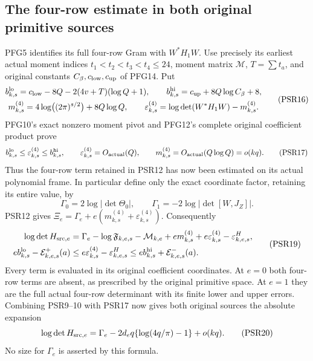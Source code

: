 \documentclass[10pt]{article}
\begin{document}
\subsection{The four-row estimate in both original primitive sources}
PFG5 identifies its full four-row Gram with $W^*H_1W$. Use precisely
its earliest actual moment indices $t_1<t_2<t_3<t_4\le24$, moment
matrix $\mathcal M$, $T=\sum t_a$, and original constants
$C_\beta,c_{\rm low},c_{\rm up}$ of PFG14. Put
\[
\begin{gathered}
 b_{k,s}^{\rm lo}=c_{\rm low}-8Q-2(4v+T)(\log Q+1),\qquad
 b_{k,s}^{\rm hi}=c_{\rm up}+8Q\log C_\beta+8,\\
 m^{(4)}_{k,s}=4\log\bigl((2\pi)^{s/2}\bigr)+8Q\log Q,\qquad
 \varepsilon^{(4)}_{k,s}=\log\det(W^*H_1W)-m^{(4)}_{k,s}.
\end{gathered}\tag{PSR16}
\]
PFG10's exact nonzero moment pivot and PFG12's complete original
coefficient product prove
\[
 b_{k,s}^{\rm lo}\le\varepsilon^{(4)}_{k,s}
              \le b_{k,s}^{\rm hi},\qquad
 \varepsilon^{(4)}_{k,s}=O_{\rm actual}(Q),\qquad
 m^{(4)}_{k,s}=O_{\rm actual}(Q\log Q)=o(kq).
\tag{PSR17}
\]
Thus the four-row term retained in PSR12 has now been estimated
on its actual polynomial frame. In particular define only the exact
coordinate factor, retaining its entire value, by
\[
 \Gamma_0=2\log|\det\Theta_0|,\qquad
 \Gamma_1=-2\log|\det[W,J_Z]|.\tag{PSR18}
\]
PSR12 gives $\Xi_e=\Gamma_e+e(m^{(4)}_{k,s}
+\varepsilon^{(4)}_{k,s})$. Consequently
\[
\begin{split}
 \log\det H_{{\rm src},e}
 &=\Gamma_e-\log\mathfrak F_{k,e,s}-\mathcal M_{k,e}
            +e m^{(4)}_{k,s}
            +e\varepsilon^{(4)}_{k,s}-\varepsilon^H_{k,e,s},\\
 e b_{k,s}^{\rm lo}-\mathcal E^+_{k,e,s}(a)
 &\le e\varepsilon^{(4)}_{k,s}-\varepsilon^H_{k,e,s}
 \le e b_{k,s}^{\rm hi}+\mathcal E^-_{k,e,s}(a).
\end{split}\tag{PSR19}
\]
Every term is evaluated in its original coefficient coordinates.
At $e=0$ both four-row terms are absent, as prescribed by the
original primitive space. At $e=1$ they are the full actual
four-row determinant with its finite lower and upper errors.
Combining PSR9--10 with PSR17 now gives both original sources
the absolute expansion
\[
 \log\det H_{{\rm src},e}
       =\Gamma_e-2d_eq\{\log(4q/\pi)-1\}+o(kq).
\tag{PSR20}
\]
No size for $\Gamma_e$ is asserted by this formula.
\end{document}
